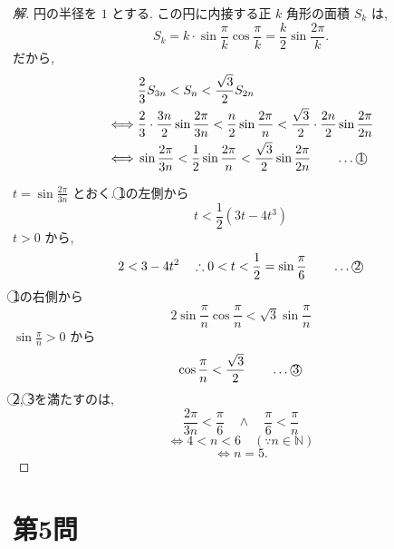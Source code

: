 \documentclass[../main.tex]{subfiles}
\begin{document}
\begin{proof}[解]
  円の半径を $1$ とする. この円に内接する正 $k$ 角形の面積 $S_k$ は,
  \[
    S_k = k \cdot \sin \frac{\pi}{k} \cos \frac{\pi}{k} = \frac{k}{2} \sin \frac{2\pi}{k}.
  \]
  だから,
  \begin{align*}
    &\frac{2}{3} S_{3n} < S_n < \frac{\sqrt{3}}{2} S_{2n} \\
    \iff &\frac{2}{3} \cdot \frac{3n}{2} \sin \frac{2\pi}{3n} < \frac{n}{2} \sin \frac{2\pi}{n} < \frac{\sqrt{3}}{2} \cdot \frac{2n}{2} \sin \frac{2\pi}{2n} \\
    \iff &\sin \frac{2\pi}{3n} < \frac{1}{2} \sin \frac{2\pi}{n} < \frac{\sqrt{3}}{2} \sin \frac{2\pi}{2n} \qquad \dots \text{\textcircled{1}}
  \end{align*}

  \begin{center}
  \end{center}

  $t = \sin \frac{2\pi}{3n}$ とおく. \textcircled{1}の左側から
  \[
    t < \frac{1}{2}(3t - 4t^3)
  \]
  $t > 0$ から,
  \[
    2 < 3 - 4t^2 \quad \therefore 0 < t < \frac{1}{2} = \sin \frac{\pi}{6} \qquad \dots \text{\textcircled{2}}
  \]
  \textcircled{1}の右側から
  \[
    2 \sin \frac{\pi}{n} \cos \frac{\pi}{n} < \sqrt{3} \sin \frac{\pi}{n}
  \]
  $\sin \frac{\pi}{n} > 0$ から
  \[
    \cos \frac{\pi}{n} < \frac{\sqrt{3}}{2} \qquad \dots \text{\textcircled{3}}
  \]
  \textcircled{2}, \textcircled{3}を満たすのは,
  \[
    \frac{2\pi}{3n} < \frac{\pi}{6} \quad \land \quad \frac{\pi}{6} < \frac{\pi}{n}
  \]
  \[
    \iff 4 < n < 6 \quad (\because n \in \mathbb{N})
  \]
  \[
    \iff n = 5.
  \]
\end{proof}

\section*{第5問}
\end{document}
